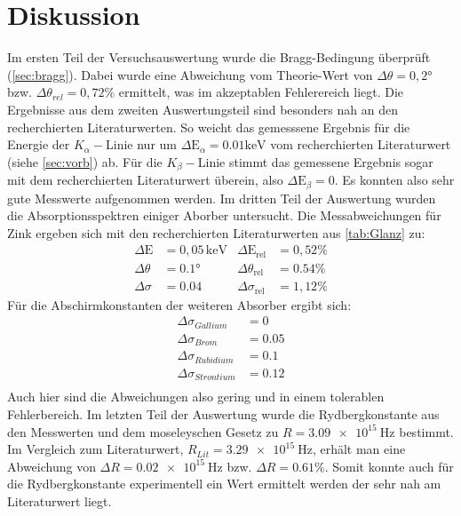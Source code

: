 \section{Diskussion}
\label{sec:Diskussion}
Im ersten Teil der Versuchsauswertung wurde die Bragg-Bedingung überprüft (\autoref{sec:bragg}). Dabei wurde eine Abweichung vom Theorie-Wert von $\Delta \theta=0,2°$ bzw. $\Delta \theta_{rel}=0,72\%$ ermittelt, was im akzeptablen Fehlerereich liegt. \newline 
Die Ergebnisse aus dem zweiten Auswertungsteil sind besonders nah an den recherchierten Literaturwerten. So weicht das gemesssene Ergebnis für die Energie der $K_\alpha-$Linie nur um $\Delta \text{E}_\alpha=0.01 \text{keV}$ vom recherchierten Literaturwert (siehe \autoref{sec:vorb}) ab. Für die $K_\beta-$Linie stimmt das gemessene Ergebnis sogar mit dem recherchierten Literaturwert überein, also $\Delta \text{E}_\beta=0$. Es konnten also sehr gute Messwerte aufgenommen werden. \newline
Im dritten Teil der Auswertung wurden die Absorptionsspektren einiger Aborber untersucht. Die Messabweichungen für Zink ergeben sich mit den recherchierten Literaturwerten aus \autoref{tab:Glanz} zu:
\begin{align*}
    \Delta\text{E}&=0,05 \, \mathrm{keV} & \Delta\text{E}_\text{rel}&=0,52\%\\
    \Delta\theta&=0.1° & \Delta\theta_\text{rel}&=0.54\%\\
    \Delta\sigma&=0.04 & \Delta\sigma_\text{rel}&=1,12\%
\end{align*}
\noindent
Für die Abschirmkonstanten der weiteren Absorber ergibt sich:
\begin{align*}
\Delta\sigma_{Gallium}&=0\\
\Delta\sigma_{Brom}&=0.05\\
\Delta\sigma_{Rubidium}&=0.1\\
\Delta\sigma_{Strontium}&=0.12\\
\end{align*}
Auch hier sind die Abweichungen also gering und in einem tolerablen Fehlerbereich.\newline
Im letzten Teil der Auswertung wurde die Rydbergkonstante aus den Messwerten und dem moseleyschen Gesetz zu $R = \SI{3.09e15}{\hertz}$ bestimmt. Im Vergleich zum Literaturwert, $R_{Lit}=\SI{3.29e15}{\hertz}$\cite{q}, erhält man eine Abweichung von $\Delta R =\SI{0.02e15}{\hertz}$ bzw. $\Delta R =0.61\%$. Somit konnte auch für die Rydbergkonstante experimentell ein Wert ermittelt werden der sehr nah am Literaturwert liegt.